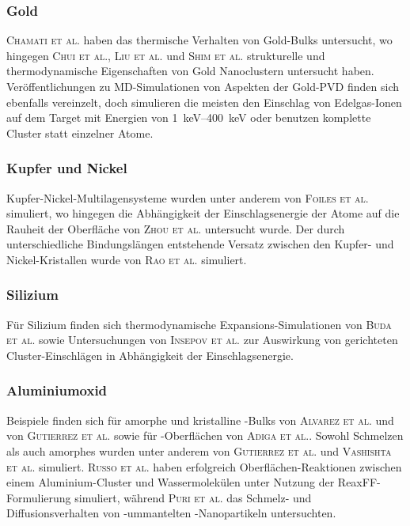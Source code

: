 \subsubsection{Gold}
\textsc{Chamati et al.}\cite{chamati_second-moment_2004} haben das thermische Verhalten von Gold-Bulks untersucht, wo hingegen \textsc{Chui et al.}\cite{chui_molecular_2007}, \textsc{Liu et al.}\cite{liu_melting_2001} und \textsc{Shim et al.}\cite{shim_molecular_2003} strukturelle und thermodynamische Eigenschaften von Gold Nanoclustern untersucht haben.
Veröffentlichungen zu MD-Simulationen von Aspekten der Gold-PVD finden sich ebenfalls vereinzelt, doch simulieren die meisten den Einschlag von Edelgas-Ionen auf dem Target mit Energien von \SIrange{1}{400}{\kilo\electronvolt}\cite{insepov_molecular_1995,shapiro_simulation_1999} oder benutzen komplette Cluster statt einzelner Atome\cite{inoue_molecular_2008}.

\subsubsection{Kupfer und Nickel}
Kupfer-Nickel-Multilagensysteme wurden unter anderem von \textsc{Foiles et al.}\cite{foiles_calculation_1985} simuliert, wo hingegen die Abhängigkeit der Einschlagsenergie der Atome auf die Rauheit der Oberfläche von \textsc{Zhou et al.}\cite{zhou_atomistic_1998} untersucht wurde.
Der durch unterschiedliche Bindungslängen entstehende Versatz zwischen den Kupfer- und Nickel-Kristallen wurde von \textsc{Rao et al.}\cite{rao_atomistic_2000} simuliert.

\subsubsection{Silizium}
Für Silizium finden sich thermodynamische Expansions-Simulationen von \textsc{Buda et al.}\cite{buda_thermal_1990} sowie Untersuchungen von \textsc{Insepov et al.}\cite{insepov_molecular_1995} zur Auswirkung von gerichteten Cluster-Einschlägen in Abhängigkeit der Einschlagsenergie.

\subsubsection{Aluminiumoxid}
Beispiele finden sich für amorphe und kristalline -Bulks von \textsc{Alvarez et al.}\cite{alvarez_computer_1995,alvarez_molecular_1992} und von \textsc{Gutierrez et al.}\cite{gutierrez_molecular_2002} sowie für -Oberflächen von \textsc{Adiga et al.}\cite{adiga_atomistic_2006}.
Sowohl Schmelzen als auch amorphes  wurden unter anderem von \textsc{Gutierrez et al.}\cite{gutierrez_structural_2000} und \textsc{Vashishta et al.}\cite{vashishta_interaction_2008} simuliert.
\textsc{Russo et al.}\cite{russo_molecular_2011} haben erfolgreich Oberflächen-Reaktionen zwischen einem Aluminium-Cluster und Wassermolekülen unter Nutzung der ReaxFF-Formulierung simuliert, während \textsc{Puri et al.}\cite{puri_thermo-mechanical_2010} das Schmelz- und Diffusionsverhalten von -ummantelten -Nanopartikeln untersuchten.

